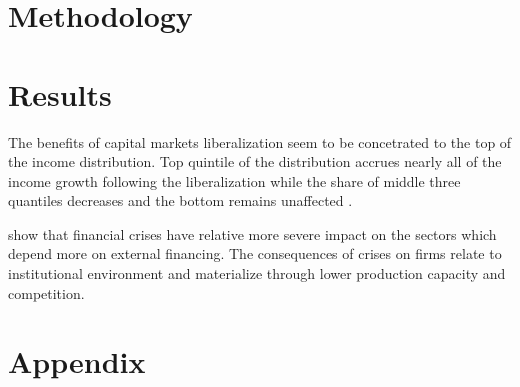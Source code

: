 \documentclass[a4paper,11pt]{article}
\begin{document}



%
%
\section{Methodology}

\section{Results}
The benefits of capital markets liberalization seem to be concetrated to the top of the income distribution. Top quintile of the distribution accrues nearly all of the income growth following the liberalization while the share of middle three quantiles decreases and the bottom remains unaffected \citep{das2003income}.

\citet{kroszneretal2007} show that financial crises have relative more severe impact on the sectors which depend more on external financing. The consequences of crises on firms relate to institutional environment and materialize through lower production capacity and competition.

\clearpage
%


%
\clearpage
%
\appendix
\section{Appendix}

\renewcommand{\thesection}{A\arabic{section}}%
\renewcommand{\thetable}{A\arabic{table}}%
\renewcommand{\thefigure}{A\arabic{figure}}%
\renewcommand{\theequation}{A\arabic{eq}} 
\end{document}
